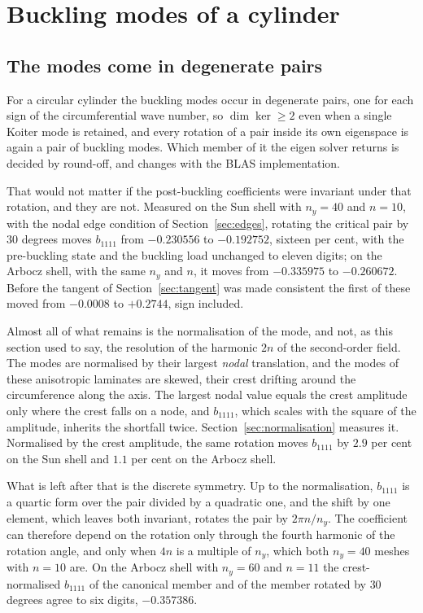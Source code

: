 \documentclass[11pt,a4paper]{article}
\begin{document}
\section{Buckling modes of a cylinder}
\label{sec:canonical}

\subsection{The modes come in degenerate pairs}

For a circular cylinder the buckling modes occur in degenerate pairs, one for
each sign of the circumferential wave number, so $\dim\ker \ge 2$ even when a
single Koiter mode is retained, and every rotation of a pair inside its own
eigenspace is again a pair of buckling modes.  Which member of it the eigen
solver returns is decided by round-off, and changes with the BLAS
implementation.

That would not matter if the post-buckling coefficients were invariant under
that rotation, and they are not.  Measured on the Sun shell with $n_y = 40$
and $n = 10$, with the nodal edge condition of Section~\ref{sec:edges},
rotating the critical pair by $30$ degrees moves $b_{1111}$ from
$-0.230556$ to $-0.192752$, sixteen per cent, with the pre-buckling state and
the buckling load unchanged to eleven digits; on the Arbocz shell, with the
same $n_y$ and $n$, it moves from $-0.335975$ to $-0.260672$.  Before the
tangent of Section~\ref{sec:tangent} was made consistent the first of these
moved from $-0.0008$ to $+0.2744$, sign included.

Almost all of what remains is the normalisation of the mode, and not, as this
section used to say, the resolution of the harmonic $2n$ of the second-order
field.  The modes are normalised by their largest \emph{nodal} translation,
and the modes of these anisotropic laminates are skewed, their crest drifting
around the circumference along the axis.  The largest nodal value equals the
crest amplitude only where the crest falls on a node, and $b_{1111}$, which
scales with the square of the amplitude, inherits the shortfall twice.
Section~\ref{sec:normalisation} measures it.  Normalised by the crest
amplitude, the same rotation moves $b_{1111}$ by $2.9$ per cent on the Sun
shell and $1.1$ per cent on the Arbocz shell.

What is left after that is the discrete symmetry.  Up to the normalisation,
$b_{1111}$ is a quartic form over the pair divided by a quadratic one, and the
shift by one element, which leaves both invariant, rotates the pair by
$2\pi n/n_y$.  The coefficient can therefore depend on the rotation only
through the fourth harmonic of the rotation angle, and only when $4n$ is a
multiple of $n_y$, which both $n_y = 40$ meshes with $n = 10$ are.  On the
Arbocz shell with $n_y = 60$ and $n = 11$ the crest-normalised $b_{1111}$ of
the canonical member and of the member rotated by $30$ degrees agree to six
digits, $-0.357386$.
\end{document}

